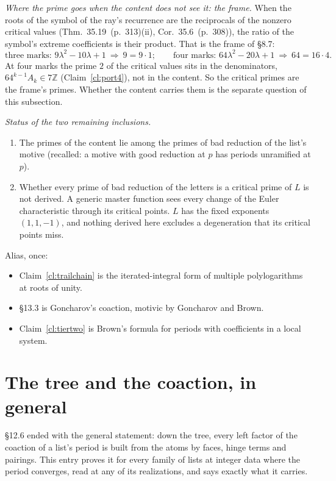 \documentclass[11pt]{article}
\newcommand{\hb}[2]{#1~(p.~#2)}   %
\theoremstyle{plain}
\theoremstyle{remark}
\begin{document}
\emph{Where the prime goes when the content does not see it: the frame.} When the roots of the symbol of the ray's recurrence are the reciprocals of the nonzero critical values (Thm.~\hb{35.19}{313}(ii), Cor.~\hb{35.6}{308}), the ratio of the symbol's extreme coefficients is their product. That is the frame of \S8.7:
\[
\text{three marks: }9\lambda^2-10\lambda+1\ \Rightarrow\ 9=9\cdot1;\qquad\text{four marks: }64\lambda^2-20\lambda+1\ \Rightarrow\ 64=16\cdot4 .
\]
At four marks the prime $2$ of the critical values sits in the denominators, $64^{k-1}A_k\in7\mathbb Z$ (Claim~\ref{cl:port4}), not in the content. So the critical primes are the frame's primes. Whether the content carries them is the separate question of this subsection.

\emph{Status of the two remaining inclusions.}
\begin{enumerate}[label=(\alph*)]
\item The primes of the content lie among the primes of bad reduction of the list's motive (recalled: a motive with good reduction at $p$ has periods unramified at $p$).
\item Whether every prime of bad reduction of the letters is a critical prime of $L$ is not derived. A generic master function sees every change of the Euler characteristic through its critical points. $L$ has the fixed exponents $(1,1,-1)$, and nothing derived here excludes a degeneration that its critical points miss.
\end{enumerate}

Alias, once:
\begin{itemize}
\item Claim~\ref{cl:trailchain} is the iterated-integral form of multiple polylogarithms at roots of unity.
\item \S13.3 is Goncharov's coaction, motivic by Goncharov and Brown.
\item Claim~\ref{cl:tiertwo} is Brown's formula for periods with coefficients in a local system.
\end{itemize}

\section{The tree and the coaction, in general}

\S12.6 ended with the general statement: down the tree, every left factor of the coaction of a list's period is built from the atoms by faces, hinge terms and pairings. This entry proves it for every family of lists at integer data where the period converges, read at any of its realizations, and says exactly what it carries.
\end{document}
